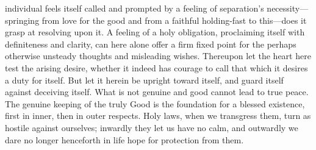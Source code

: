 \documentclass[12pt,a4paper]{book}
\begin{document}
individual feels itself called and prompted by a feeling of separation's
necessity---springing from love for the good and from a faithful
holding-fast to this---does it grasp at resolving upon it. A feeling of a
holy obligation, proclaiming itself with definiteness and clarity, can here
alone offer a firm fixed point for the perhaps otherwise unsteady thoughts
and misleading wishes. Thereupon let the heart here test the arising
desire, whether it indeed has courage to call that which it desires a duty
for itself. But let it herein be upright toward itself, and guard itself
against deceiving itself. What is not genuine and good cannot lead to true
peace. The genuine keeping of the truly Good is the foundation for a
blessed existence, first in inner, then in outer respects. Holy laws, when
we transgress them, turn as hostile against ourselves; inwardly they let us
have no calm, and outwardly we dare no longer henceforth in life hope for
protection from them.
\end{document}
